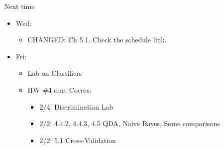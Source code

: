 \documentclass[aspectratio=169,usenames,dvipsnames]{beamer}
\begin{document}
\begin{frame}[t]{Next time}

	\begin{itemize}
		\item Wed:
		\begin{itemize}
			\item CHANGED: Ch 5.1. Check the schedule link.
		\end{itemize}
		\item Fri:
		\begin{itemize}
			\item Lab on Classifiers
			\item HW \#4 due. Covers:
			\begin{itemize}
				\item 2/4: Discrimination Lab
				\item 2/2: 4.4.2, 4.4.3, 4.5 QDA, Naive Bayes, Some comparisons
				\item 2/2: 5.1 Cross-Validation
			\end{itemize}
		\end{itemize}


	\end{itemize}
\end{frame}
\end{document}
